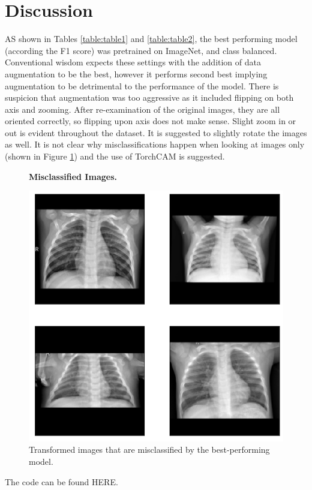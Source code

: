 \documentclass[10pt,twocolumn,letterpaper]{article}
\begin{document}
\section{Discussion}

AS shown in Tables \ref{table:table1} and \ref{table:table2}, the best performing model (according the F1 score) was pretrained on ImageNet, and class balanced. Conventional wisdom expects these settings with the addition of data augmentation to be the best, however it performs second best implying augmentation to be detrimental to the performance of the model. There is suspicion that augmentation was too aggressive as it included flipping on both axis and zooming. After re-examination of the original images, they are all oriented correctly, so flipping upon axis does not make sense. Slight zoom in or out is evident throughout the dataset. It is suggested to slightly rotate the images as well. It is not clear why misclassifications happen when looking at images only (shown in Figure \ref{fig:fig6}) and the use of TorchCAM is suggested.

\begin{figure}[h]
   \begin{center}
      \textbf{Misclassified Images.}\par\medskip
      \includegraphics[width=0.95\linewidth]{images/misclassfied.png}
   \end{center}
   \caption{Transformed images that are misclassified by the best-performing model.}
\label{fig:fig6}
\end{figure}

The code can be found HERE.
\end{document}
